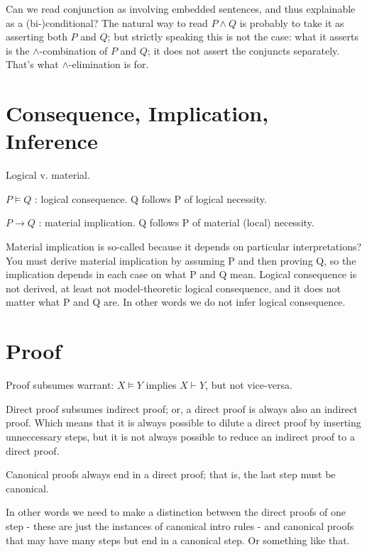 \documentclass{article}
\begin{document}
\begin{remark}
  Can we read conjunction as involving embedded sentences, and thus
  explainable as a (bi-)conditional?  The natural way to read \(P\land
  Q\) is probably to take it as asserting both \(P\) and \(Q\); but
  strictly speaking this is not the case: what it asserts is the
  \(\land\)-combination of \(P\) and \(Q\); it does not assert the
  conjuncts separately.  That's what \(\land\)-elimination is for.
\end{remark}

\section{Consequence, Implication, Inference}

Logical v. material.

\(P\models Q\) :  logical consequence.  Q follows P of logical necessity.

\(P\to Q\) : material implication.  Q follows P of material (local) necessity.

Material implication is so-called because it depends on particular
interpretations?  You must derive material implication by assuming P
and then proving Q, so the implication depends in each case on what P
and Q mean.  Logical consequence is not derived, at least not
model-theoretic logical consequence, and it does not matter what P and
Q are.  In other words we do not infer logical consequence.

\section{Proof}

Proof subsumes warrant:  \(X\models Y\) implies \(X\vdash Y\), but not vice-versa.

Direct proof subsumes indirect proof; or, a direct proof is always
also an indirect proof.  Which means that it is always possible to
dilute a direct proof by inserting unneccessary steps, but it is not
always possible to reduce an indirect proof to a direct proof.

Canonical proofs always end in a direct proof; that is, the last step
must be canonical.

In other words we need to make a distinction between the direct proofs
of one step - these are just the instances of canonical intro rules -
and canonical proofs that may have many steps but end in a canonical
step.  Or something like that.
\end{document}
